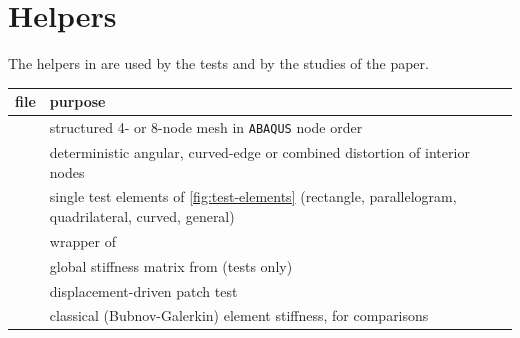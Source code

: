 \section{Helpers}

The helpers in  are used by the tests and by the studies of the
paper.

\begin{xltabular}{\linewidth}{@{}P{5.0cm}L@{}}
  \toprule
  file & purpose \\
  \midrule
   & structured 4- or 8-node mesh in \texttt{ABAQUS} node order \\
   & deterministic angular, curved-edge or combined
    distortion of interior nodes \\
   & single test elements of
    \cref{fig:test-elements} (rectangle, parallelogram, quadrilateral, curved,
    general) \\
   & wrapper of  \\
   & global stiffness matrix from  (tests only) \\
   & displacement-driven patch test \\
   & classical (Bubnov-Galerkin) element stiffness,
    for comparisons \\
  \bottomrule
\end{xltabular}

